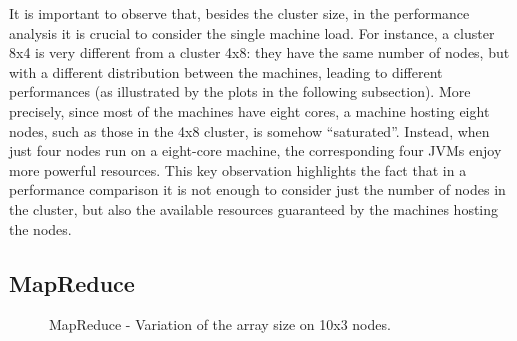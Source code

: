 \documentclass[a4paper]{article}
\numberwithin{equation}{section}
\begin{document}
It is important to observe that, besides the cluster size, in the
performance analysis it
is crucial to consider the single machine load. For instance, a
cluster 8x4 is very different from a cluster 4x8: they have
the same number of nodes, but with a different distribution between
the machines, leading to different performances (as illustrated by the
plots in the following subsection).
More precisely, since most of the machines have eight cores, 
a machine hosting eight nodes, such as those in the 4x8
cluster, is somehow ``saturated''. Instead, when just four nodes run
on a eight-core machine, the corresponding four JVMs enjoy more
powerful resources.
This key observation highlights the fact that in a performance
comparison it is not enough to consider just the number of  
nodes in the cluster, but also the available resources 
guaranteed by the machines hosting the nodes.




\subsection{MapReduce}


\begin{figure*}[t]
\footnotesize
\centering
{}
\caption{MapReduce - Variation of the array size on 10x3 nodes.}
\label{fig:MRarrayVar}
\end{figure*}
\end{document}
